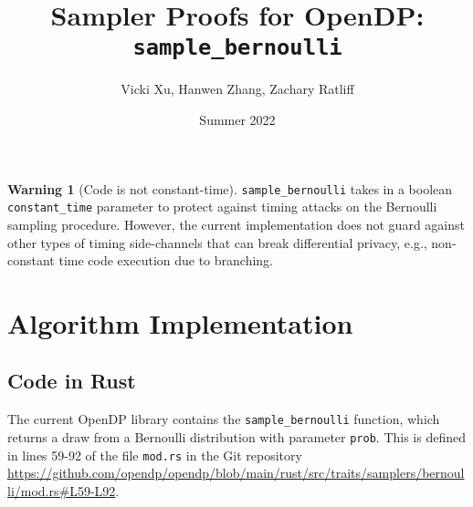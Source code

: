 \documentclass[11pt,a4paper]{article}
\title{Sampler Proofs for OpenDP: \texttt{sample\_bernoulli}}
\author{Vicki Xu, Hanwen Zhang, Zachary Ratliff}
\date{Summer 2022}
\theoremstyle{definition}
\newtheorem{warning}{Warning}
\begin{document}
\maketitle
\tableofcontents


\begin{tcolorbox}
\begin{warning}[Code is not constant-time]
 \texttt{sample\_bernoulli} takes in a boolean \texttt{constant\_time} parameter to protect against timing attacks on the Bernoulli sampling procedure. However, the current implementation does not guard against other types of timing side-channels that can break differential privacy, e.g., non-constant time code execution due to branching.
\end{warning}
\end{tcolorbox}

\section{Algorithm Implementation}
\subsection{Code in Rust}

The current OpenDP library contains the \texttt{sample\_bernoulli} function, which returns a draw from a Bernoulli distribution with parameter \texttt{prob}. This is defined in lines 59-92 of the file \texttt{mod.rs} in the Git repository \url{https://github.com/opendp/opendp/blob/main/rust/src/traits/samplers/bernoulli/mod.rs#L59-L92}. 

\end{document}

